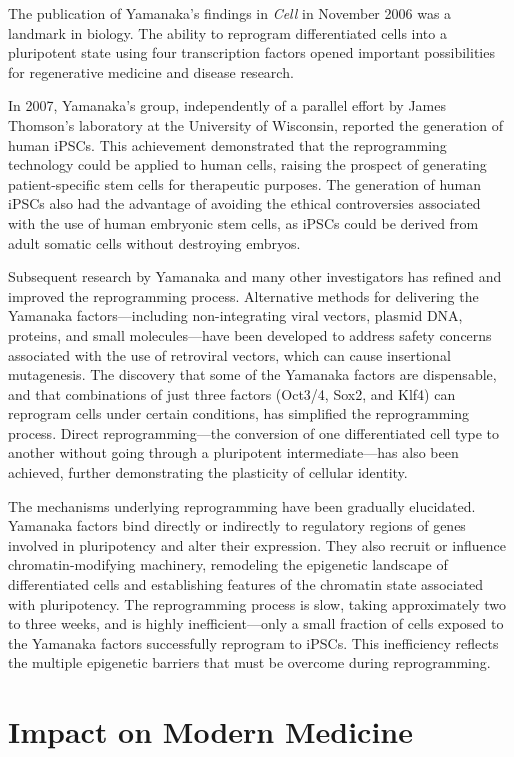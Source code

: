 The publication of Yamanaka's findings in \textit{Cell} in November 2006 was a landmark in biology. The ability to reprogram differentiated cells into a pluripotent state using four transcription factors opened important possibilities for regenerative medicine and disease research.

In 2007, Yamanaka's group, independently of a parallel effort by James Thomson's laboratory at the University of Wisconsin, reported the generation of human iPSCs. This achievement demonstrated that the reprogramming technology could be applied to human cells, raising the prospect of generating patient-specific stem cells for therapeutic purposes. The generation of human iPSCs also had the advantage of avoiding the ethical controversies associated with the use of human embryonic stem cells, as iPSCs could be derived from adult somatic cells without destroying embryos.

Subsequent research by Yamanaka and many other investigators has refined and improved the reprogramming process. Alternative methods for delivering the Yamanaka factors---including non-integrating viral vectors, plasmid DNA, proteins, and small molecules---have been developed to address safety concerns associated with the use of retroviral vectors, which can cause insertional mutagenesis. The discovery that some of the Yamanaka factors are dispensable, and that combinations of just three factors (Oct3/4, Sox2, and Klf4) can reprogram cells under certain conditions, has simplified the reprogramming process. Direct reprogramming---the conversion of one differentiated cell type to another without going through a pluripotent intermediate---has also been achieved, further demonstrating the plasticity of cellular identity.

The mechanisms underlying reprogramming have been gradually elucidated. Yamanaka factors bind directly or indirectly to regulatory regions of genes involved in pluripotency and alter their expression. They also recruit or influence chromatin-modifying machinery, remodeling the epigenetic landscape of differentiated cells and establishing features of the chromatin state associated with pluripotency. The reprogramming process is slow, taking approximately two to three weeks, and is highly inefficient---only a small fraction of cells exposed to the Yamanaka factors successfully reprogram to iPSCs. This inefficiency reflects the multiple epigenetic barriers that must be overcome during reprogramming.

\section{Impact on Modern Medicine}

